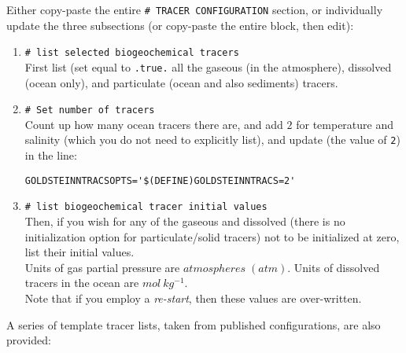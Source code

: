 Either copy-paste the entire \texttt{\# TRACER\ CONFIGURATION} section, or individually update the three subsections (or copy-paste the entire block, then edit):

\begin{enumerate}[noitemsep]
\vspace{1mm}
\item \texttt{\# list selected biogeochemical tracers}
\\First list (set equal to \texttt{.true.} all the gaseous (in the atmosphere), dissolved (ocean only), and particulate (ocean and also sediments) tracers.
\vspace{1mm}
\item \texttt{\# Set number of tracers}
\\Count up how many ocean tracers there are, and add \(2\) for temperature and salinity (which you do not need to explicitly list), and update (the value of \texttt{2}) in the line:
\footnotesize\begin{verbatim}
GOLDSTEINNTRACSOPTS='$(DEFINE)GOLDSTEINNTRACS=2'
\end{verbatim}\normalsize
\vspace{1mm}
\item \texttt{\# list biogeochemical tracer initial values}
\\Then, if you wish for any of the gaseous and dissolved (there is no initialization option for particulate/solid tracers) not to be initialized at zero, list their initial values.
\\Units of gas partial pressure are \(atmospheres \;(atm)\). Units of dissolved tracers in the ocean are \(mol\:kg^{-1}\).
\\Note that if you employ a \textit{re-start}, then these values are over-written.
\end{enumerate}
\vspace{1mm}

\newpage 

A series of template tracer lists, taken from published configurations, are also provided:

